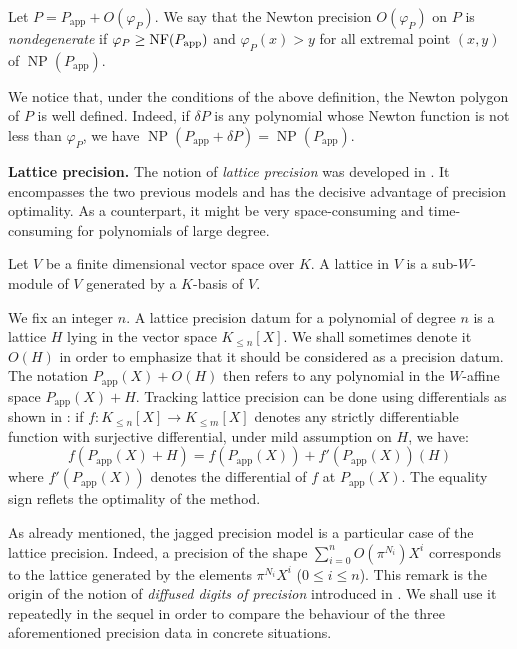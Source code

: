 \documentclass{sig-alternate-05-2015}
\DeclareMathOperator{\NP}{NP}
\newcommand{\NF}{\text{\rm NF}}
\newcommand{\app}{\textrm{app}}
\begin{document}
\begin{deftn}
\label{def:nondeg}
Let $P = P_\app + O(\varphi_P)$. We say that the Newton precision 
$O(\varphi_P)$ on $P$ is \emph{nondegenerate} if $\varphi_P \geq 
\NF(P_\app)$ and $\varphi_P(x) > y$ for all extremal point $(x,y)$ of 
$\NP(P_\app)$.
\end{deftn}

We notice that, under the conditions of the above definition, the
Newton polygon of $P$ is well defined. Indeed, if $\delta P$ is any
polynomial whose Newton function is not less than $\varphi_P$, we
have $\NP(P_\app + \delta P) = \NP(P_\app)$.

\medskip

\noindent
{\bf Lattice precision.}
The notion of \emph{lattice precision} was developed in 
\cite{caruso-roe-vaccon:14a}. It encompasses the two previous models and has
the decisive advantage of precision optimality.
 As a counterpart, it might be very space-consuming and time-consuming 
 for polynomials of large degree.

\begin{deftn}
Let $V$ be a finite dimensional vector space over $K$. A lattice
in $V$ is a sub-$W$-module of $V$ generated by a $K$-basis of
$V$.
\end{deftn}

\noindent
We fix an integer $n$. A lattice precision datum for a polynomial of 
degree $n$ is a lattice $H$ lying in the vector space $K_{\leq n}[X]$. 
We shall sometimes denote it $O(H)$ in order to emphasize that it should 
be considered as a precision datum. The notation $P_\app(X) + O(H)$ then 
refers to any polynomial in the $W$-affine space $P_\app(X) + H$. 
Tracking lattice precision can be done using differentials as shown in
\cite[Lemma~3.4 and Proposition~3.12]{caruso-roe-vaccon:14a}: if $f : K_{\leq n}[X] 
\to K_{\leq m}[X]$ denotes any strictly differentiable function with
surjective differential, under mild assumption on $H$, we have:
$$f(P_\app(X)+H) = f(P_\app(X)) + f'(P_\app(X))(H)$$
where $f'(P_\app(X))$ denotes the differential of $f$ at $P_\app(X)$. 
The equality sign reflets the optimality of the method.

As already mentioned, the jagged precision model is a particular case of 
the lattice precision. Indeed, a precision of the shape $\sum_{i=0}^n 
O(\pi^{N_i}) X^i$ corresponds to the lattice generated by the elements 
$\pi^{N_i} X^i$ ($0 \leq i \leq n$). This remark is the origin of the 
notion of \emph{diffused digits of precision} introduced in 
\cite[Definition~2.3]{caruso-roe-vaccon:15a}. We shall use it repeatedly in the 
sequel in order to compare the behaviour of the three aforementioned 
precision data in concrete situations.
\end{document}
